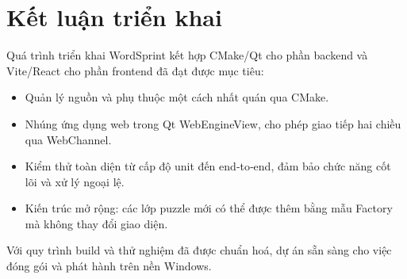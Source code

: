 \section{Kết luận triển khai}
\label{sec:implementation_conclusion}
Quá trình triển khai WordSprint kết hợp CMake/Qt cho phần backend và Vite/React cho phần frontend đã đạt được mục tiêu:
\begin{itemize}
    \item Quản lý nguồn và phụ thuộc một cách nhất quán qua CMake.
    \item Nhúng ứng dụng web trong Qt WebEngineView, cho phép giao tiếp hai chiều qua WebChannel.
    \item Kiểm thử toàn diện từ cấp độ unit đến end‑to‑end, đảm bảo chức năng cốt lõi và xử lý ngoại lệ.
    \item Kiến trúc mở rộng: các lớp puzzle mới có thể được thêm bằng mẫu Factory mà không thay đổi giao diện.
\end{itemize}
Với quy trình build và thử nghiệm đã được chuẩn hoá, dự án sẵn sàng cho việc đóng gói và phát hành trên nền Windows.


